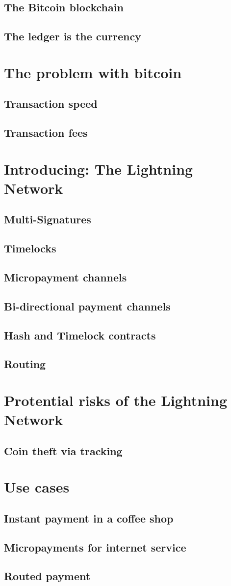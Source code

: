 \documentclass[a4paper, 12pt]{report}
\begin{document}
\section{The Bitcoin blockchain}
\section{The ledger is the currency}

\chapter{The problem with bitcoin}
\section{Transaction speed}
\section{Transaction fees}

\chapter{Introducing: The Lightning Network}
\section{Multi-Signatures}
\section{Timelocks}
\section{Micropayment channels}
\section{Bi-directional payment channels}
\section{Hash and Timelock contracts}
\section{Routing}

\chapter{Protential risks of the Lightning Network}
\section{Coin theft via tracking}

\chapter{Use cases}
\section{Instant payment in a coffee shop}
\section{Micropayments for internet service}
\section{Routed payment}
\end{document}
